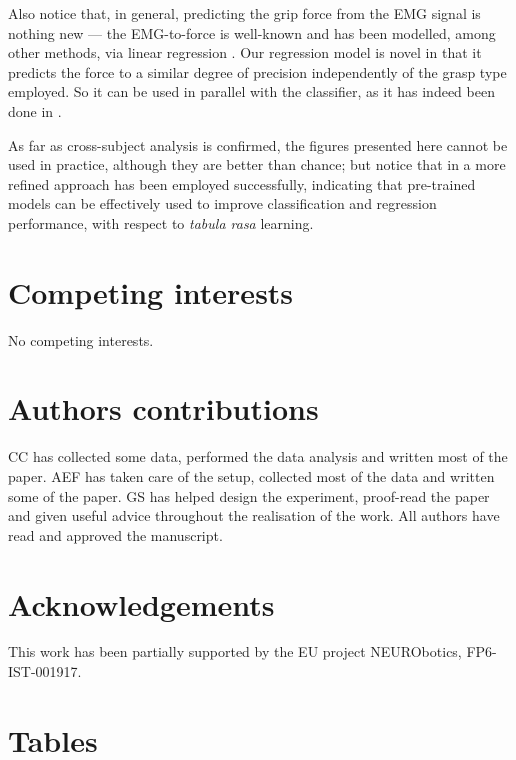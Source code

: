 \documentclass[10pt]{bmc_article}
\newenvironment{bmcformat}
  {\begin{raggedright}\baselineskip20pt\sloppy\setboolean{publ}{false}}
  {\end{raggedright}\baselineskip20pt\sloppy}
\begin{document}
\begin{bmcformat}
Also notice that, in general, predicting the grip force from the EMG signal
is nothing new --- the EMG-to-force is well-known and has been modelled,
among other methods, via linear regression \cite{Hoozemans05}. Our regression model
is novel in that it predicts the force to a similar degree of precision
independently of the grasp type employed. So it can be used in parallel
with the classifier, as it has indeed been done in \cite{2008.BioCyb}.

As far as cross-subject analysis is confirmed, the figures presented here
cannot be used in practice, although they are better than chance; but notice
that in \cite{2009.ICRA} a more refined approach has been employed successfully,
indicating that pre-trained models can be effectively used to improve
classification and regression performance, with respect to \emph{tabula rasa}
learning.

\section*{Competing interests}

No competing interests.

\section*{Authors contributions}

CC has collected some data, performed the data analysis and written most of the
paper. AEF has taken care of the setup, collected most of the data and written
some of the paper. GS has helped design the experiment, proof-read the paper
and given useful advice throughout the realisation of the work. All authors
have read and approved the manuscript.

\section*{Acknowledgements}

This work has been partially supported by the EU project NEURObotics, FP6-IST-001917.

{
   }     %


\newpage
\section*{Tables}


\end{bmcformat}
\end{document}

